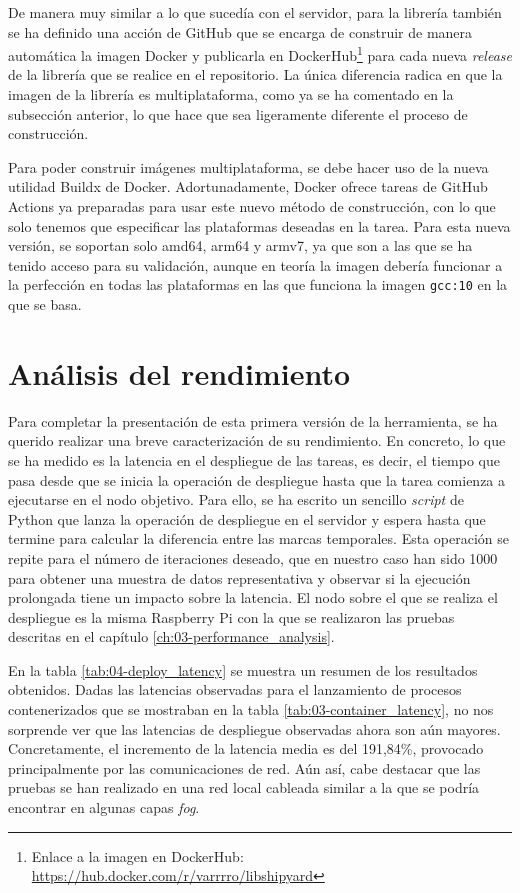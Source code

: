 De manera muy similar a lo que sucedía con el servidor, para la librería también
se ha definido una acción de GitHub que se encarga de construir de manera
automática la imagen Docker y publicarla en DockerHub\footnote{Enlace a la
    imagen en DockerHub: \url{https://hub.docker.com/r/varrrro/libshipyard}} para
cada nueva \textit{release} de la librería que se realice en el repositorio. La
única diferencia radica en que la imagen de la librería es multiplataforma, como
ya se ha comentado en la subsección anterior, lo que hace que sea ligeramente
diferente el proceso de construcción.

Para poder construir imágenes multiplataforma, se debe hacer uso de la nueva
utilidad Buildx de Docker. Adortunadamente, Docker ofrece tareas de GitHub
Actions ya preparadas para usar este nuevo método de construcción, con lo que
solo tenemos que especificar las plataformas deseadas en la tarea. Para esta
nueva versión, se soportan solo amd64, arm64 y armv7, ya que son a las que se ha
tenido acceso para su validación, aunque en teoría la imagen debería funcionar a
la perfección en todas las plataformas en las que funciona la imagen
\texttt{gcc:10} en la que se basa.

\section{Análisis del rendimiento}
\label{sec:04-performance}

Para completar la presentación de esta primera versión de la herramienta, se ha
querido realizar una breve caracterización de su rendimiento. En concreto, lo
que se ha medido es la latencia en el despliegue de las tareas, es decir, el
tiempo que pasa desde que se inicia la operación de despliegue hasta que la
tarea comienza a ejecutarse en el nodo objetivo. Para ello, se ha escrito un
sencillo \textit{script} de Python que lanza la operación de despliegue en el
servidor y espera hasta que termine para calcular la diferencia entre las marcas
temporales. Esta operación se repite para el número de iteraciones deseado, que
en nuestro caso han sido 1000 para obtener una muestra de datos representativa y
observar si la ejecución prolongada tiene un impacto sobre la latencia. El
nodo sobre el que se realiza el despliegue es la misma Raspberry Pi con la que
se realizaron las pruebas descritas en el capítulo
\ref{ch:03-performance_analysis}.

En la tabla \ref{tab:04-deploy_latency} se muestra un resumen de los resultados
obtenidos. Dadas las latencias observadas para el lanzamiento de procesos
contenerizados que se mostraban en la tabla \ref{tab:03-container_latency}, no
nos sorprende ver que las latencias de despliegue observadas ahora son aún
mayores. Concretamente, el incremento de la latencia media es del 191,84\%,
provocado principalmente por las comunicaciones de red. Aún así, cabe destacar
que las pruebas se han realizado en una red local cableada similar a la que se
podría encontrar en algunas capas \textit{fog}.

